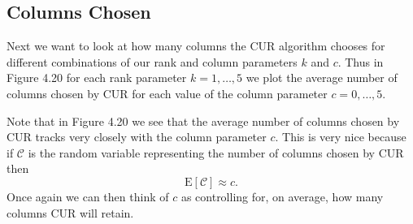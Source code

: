 \documentclass{book}
\begin{document}
\subsection{Columns Chosen}

Next we want to look at how many columns the CUR algorithm chooses for different combinations of our rank and column parameters $k$ and $c$. Thus in Figure 4.20 for each rank parameter $k=1,\ldots,5$ we plot the average number of columns chosen by CUR for each value of the column parameter $c=0,\ldots,5$. 

Note that in Figure 4.20 we see that the average number of columns chosen by CUR tracks very closely with the column parameter $c$. This is very nice because if $\mathscr{C}$ is the random variable representing the number of columns chosen by CUR then 
$$
\text{E}\left[\mathscr{C}\right]\approx c.
$$
Once again we can then think of $c$ as controlling for, on average, how many columns CUR will retain. 

\end{document}
